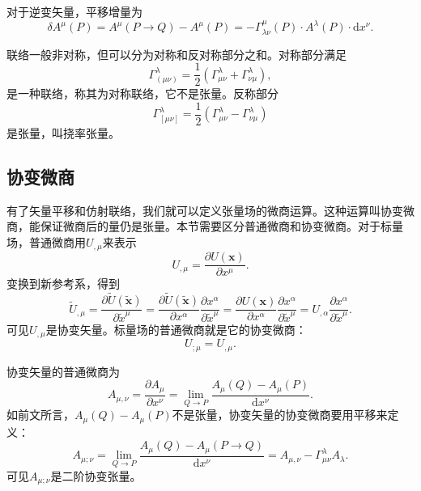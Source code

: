 \documentclass[11pt, a4paper, oneside, onecolumn]{ctexart}
\numberwithin{equation}{subsection}
\begin{document}
对于逆变矢量，平移增量为
\begin{equation}
\delta{}A^{\mu}\left(P\right)=A^{\mu}\left(P\to Q\right)-A^{\mu}\left(P\right)=-\Gamma_{\lambda\nu}^{\mu}\left(P\right)\cdot A^{\lambda}\left(P\right)\cdot \mathrm{d}x^{\nu}.
\end{equation}

联络一般非对称，但可以分为对称和反对称部分之和。对称部分满足
\begin{equation}
\Gamma_{\left(\mu\nu\right)}^{\lambda}=\frac{1}{2}\left(\Gamma_{\mu\nu}^{\lambda}+\Gamma^{\lambda}_{\nu\mu}\right),
\end{equation}
是一种联络，称其为对称联络，它不是张量。反称部分
\begin{equation}
\Gamma_{\left[\mu\nu\right]}^{\lambda}=\frac{1}{2}\left(\Gamma_{\mu\nu}^{\lambda}-\Gamma_{\nu\mu}^{\lambda}\right)
\end{equation}
是张量，叫挠率张量。

\subsection{协变微商}
有了矢量平移和仿射联络，我们就可以定义张量场的微商运算。这种运算叫协变微商，能保证微商后的量仍是张量。本节需要区分普通微商和协变微商。对于标量场，普通微商用$U_{,\mu}$来表示
\begin{equation}
U_{,\mu}=\frac{\partial{}U\left(\boldsymbol{x}\right)}{\partial{}x^{\mu}}.
\end{equation}
变换到新参考系，得到
\begin{equation}
\widetilde{U}_{,\mu}=\frac{\partial{}\widetilde{U}\left(\widetilde{\boldsymbol{x}}\right)}{\partial{}\widetilde{x}^{\mu}}=\frac{\partial{}\widetilde{U}\left(\widetilde{\boldsymbol{x}}\right)}{\partial{}x^{\alpha}}\frac{\partial{}x^{\alpha}}{\partial{}\widetilde{x}^{\mu}}=\frac{\partial{}U\left(\boldsymbol{x}\right)}{\partial{}x^{\alpha}}\frac{\partial{}x^{\alpha}}{\partial{}\widetilde{x}^{\mu}}=U_{,\alpha}\frac{\partial{}x^{\alpha}}{\partial{}\widetilde{x}^{\mu}}.
\end{equation}
可见$U_{,\mu}$是协变矢量。标量场的普通微商就是它的协变微商：
\begin{equation}
U_{;\mu}=U_{,\mu}.
\end{equation}

协变矢量的普通微商为
\begin{equation}
A_{\mu,\nu}=\frac{\partial{}A_{\mu}}{\partial{}x^{\nu}}=\lim_{Q\to P}\frac{A_{\mu}\left(Q\right)-A_{\mu}\left(P\right)}{\mathrm{d}x^{\nu}}.
\end{equation}
如前文所言，$A_{\mu}\left(Q\right)-A_{\mu}\left(P\right)$不是张量，协变矢量的协变微商要用平移来定义：
\begin{equation}
A_{\mu;\nu}=\lim_{Q\to P}\frac{A_{\mu}\left(Q\right)-A_{\mu}\left(P\to Q\right)}{\mathrm{d}x^{\nu}}=A_{\mu,\nu}-\Gamma_{\mu\nu}^{\lambda}A_{\lambda}.
\end{equation}
可见$A_{\mu;\nu}$是二阶协变张量。
\end{document}
